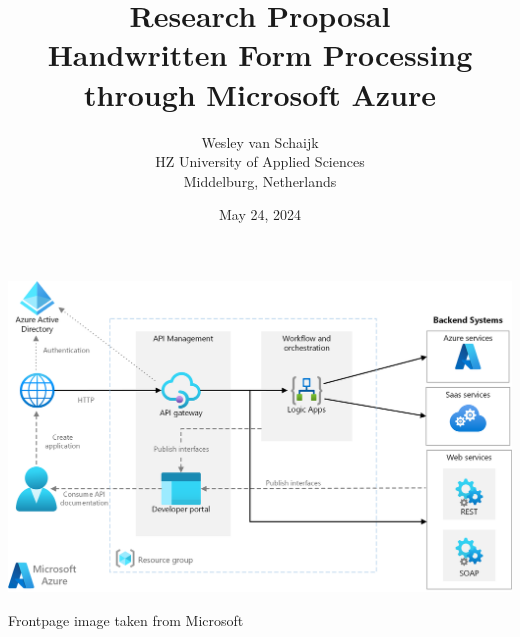 \documentclass{article}
\title{Research Proposal \\ Handwritten Form Processing through Microsoft Azure}
\author{Wesley van Schaijk \\ HZ University of Applied Sciences \\ Middelburg, Netherlands}
\date{May 24, 2024}
\begin{document}
\maketitle

\begin{center}
    \includegraphics[width=15cm]{./graphics/integration.png}
\end{center}

\newpage

\begin{multicols}{2}
    
    
    
\end{multicols}

{
    \newpage
    \raggedright
    
    

    Frontpage image taken from Microsoft \cite{Microsoft2024}
}
\end{document}
